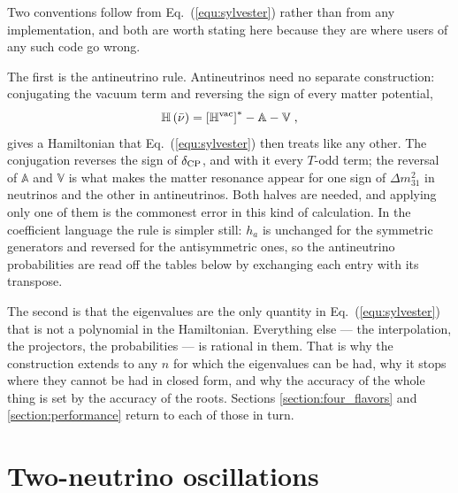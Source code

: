\documentclass[final,5p,times,twocolumn]{elsarticle}
\newcommand{\eq}{Eq.}
\newcommand{\equ}[1]{\eq~(\ref{equ:#1})}
\providecommand{\DIFaddtex}[1]{{\protect\color{blue} \sf #1}} %
\providecommand{\DIFaddend}{} %
\providecommand{\DIFadd}[1]{\DIFaddtex{#1}} %
\begin{document}
\DIFadd{Two conventions follow from \equ{sylvester} rather than from any implementation, and both are worth stating here because they are where users of any such code go wrong.
}

\DIFadd{The first is the antineutrino rule.  Antineutrinos need no separate construction: conjugating the vacuum term and reversing the sign of every matter potential,
}\begin{equation}
 \label{equ:antineutrino}
 \mathbb{H}\left(\bar{\nu}\right)
 =
 \left[\mathbb{H}^{\rm vac}\right]^\ast - \mathbb{A} - \mathbb{V} \;,
\end{equation}
\DIFadd{gives a Hamiltonian that \equ{sylvester} then treats like any other.  The conjugation reverses the sign of $\delta_{\rm CP}$, and with it every $T$-odd term; the reversal of $\mathbb{A}$ and $\mathbb{V}$ is what makes the matter resonance appear for one sign of $\Delta m_{31}^2$ in neutrinos and the other in antineutrinos.  Both halves are needed, and applying only one of them is the commonest error in this kind of calculation.  In the coefficient language the rule is simpler still: $h_a$ is unchanged for the symmetric generators and reversed for the antisymmetric ones, so the antineutrino probabilities are read off the tables below by exchanging each entry with its transpose.
}

\DIFadd{The second is that the eigenvalues are the only quantity in \equ{sylvester} that is not a polynomial in the Hamiltonian.  Everything else --- the interpolation, the projectors, the probabilities --- is rational in them.  That is why the construction extends to any $n$ for which the eigenvalues can be had, why it stops where they cannot be had in closed form, and why the accuracy of the whole thing is set by the accuracy of the roots.  Sections \ref{section:four_flavors} and \ref{section:performance} return to each of those in turn.
}





\DIFaddend \section{Two-neutrino oscillations}
\label{section:two_flavors}
\end{document}
